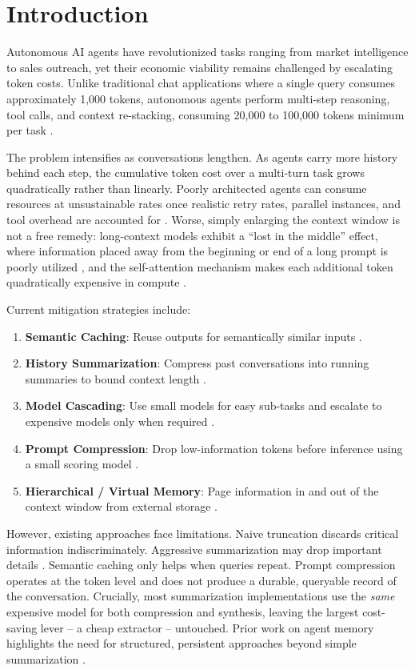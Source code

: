 \documentclass[conference]{IEEEtran}
\begin{document}
\section{Introduction}

Autonomous AI agents have revolutionized tasks ranging from market intelligence to sales outreach, yet their economic viability remains challenged by escalating token costs. Unlike traditional chat applications where a single query consumes approximately 1,000 tokens, autonomous agents perform multi-step reasoning, tool calls, and context re-stacking, consuming 20,000 to 100,000 tokens minimum per task \cite{zhou2024agents, park2023generative}.

The problem intensifies as conversations lengthen. As agents carry more history behind each step, the cumulative token cost over a multi-turn task grows quadratically rather than linearly. Poorly architected agents can consume resources at unsustainable rates once realistic retry rates, parallel instances, and tool overhead are accounted for \cite{shinn2023reflexion}. Worse, simply enlarging the context window is not a free remedy: long-context models exhibit a ``lost in the middle'' effect, where information placed away from the beginning or end of a long prompt is poorly utilized \cite{nfliu2023lost}, and the self-attention mechanism makes each additional token quadratically expensive in compute \cite{packer2023memgpt}.

Current mitigation strategies include:
\begin{enumerate}
    \item \textbf{Semantic Caching}: Reuse outputs for semantically similar inputs \cite{bang2023gptcache}.
    \item \textbf{History Summarization}: Compress past conversations into running summaries to bound context length \cite{acl2024}.
    \item \textbf{Model Cascading}: Use small models for easy sub-tasks and escalate to expensive models only when required \cite{chen2023frugalgpt}.
    \item \textbf{Prompt Compression}: Drop low-information tokens before inference using a small scoring model \cite{jiang2023llmlingua}.
    \item \textbf{Hierarchical / Virtual Memory}: Page information in and out of the context window from external storage \cite{packer2023memgpt}.
\end{enumerate}

However, existing approaches face limitations. Naive truncation discards critical information indiscriminately. Aggressive summarization may drop important details \cite{acl2024}. Semantic caching only helps when queries repeat. Prompt compression operates at the token level and does not produce a durable, queryable record of the conversation. Crucially, most summarization implementations use the \emph{same} expensive model for both compression and synthesis, leaving the largest cost-saving lever -- a cheap extractor -- untouched. Prior work on agent memory highlights the need for structured, persistent approaches beyond simple summarization \cite{park2023generative, zhong2024memorybank, zhang2024memorysurvey}.
\end{document}
